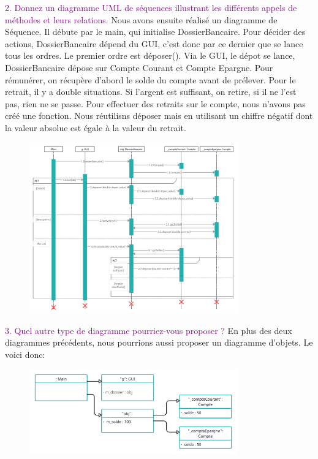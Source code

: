 \documentclass{article}
\begin{document}
\textcolor{Purple}{2. Donnez un diagramme UML de séquences illustrant les différents appels de méthodes et leurs relations.}
\newline
Nous avons ensuite réalisé un diagramme de Séquence. Il débute par le main, qui initialise DossierBancaire. Pour décider des actions, DossierBancaire dépend du GUI, c'est donc par ce dernier que se lance tous les ordres.
Le premier ordre est déposer(). Via le GUI, le dépot se lance, DossierBancaire dépose sur Compte Courant et Compte Epargne.
Pour rémunérer, on récupère d'abord le solde du compte avant de prélever.
Pour le retrait, il y a double situations. Si l'argent est suffisant, on retire, si il ne l'est pas, rien ne se passe.
Pour effectuer des retraits sur le compte, nous n'avons pas créé une fonction. Nous réutilisns déposer mais en utilisant un chiffre négatif dont la valeur absolue est égale à la valeur du retrait.
\begin{figure}[h]
\includegraphics[width=0.8\textwidth]{diagramSequence-min.png}
\end{figure}

\textcolor{Purple}{3. Quel autre type de diagramme pourriez-vous proposer ?}
\newline
En plus des deux diagrammes précédents, nous pourrions aussi proposer un diagramme d'objets. Le voici donc:



\begin{figure}[h]
\includegraphics[width=0.8\textwidth]{diagrammeObj.png}
\end{figure}
\end{document}
